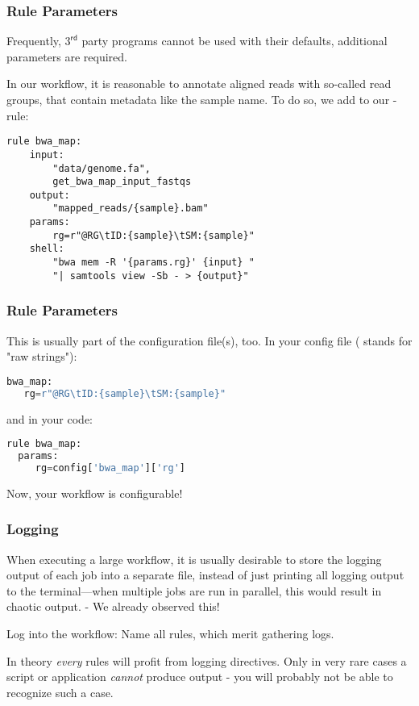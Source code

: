 \begin{frame}[fragile]
  \frametitle{Rule Parameters}
  \begin{warning}
  	Frequently, $3^\mathsf{rd}$ party programs cannot be used with their defaults, additional parameters are required.
  \end{warning}
  In our workflow, it is reasonable to annotate aligned reads with so-called read groups, that contain metadata like the sample name. \newline
  To do so, we add to our -rule:
  \begin{lstlisting}[style=Plain,basicstyle=\footnotesize]
rule bwa_map:
    input:
        "data/genome.fa",
        get_bwa_map_input_fastqs
    output:
        "mapped_reads/{sample}.bam"
    params:
        rg=r"@RG\tID:{sample}\tSM:{sample}"
    shell:
        "bwa mem -R '{params.rg}' {input} "
        "| samtools view -Sb - > {output}"
  \end{lstlisting}
\end{frame}

\begin{frame}[fragile]
  \frametitle{Rule Parameters}
  This is usually part of the configuration file(s), too.\newline
  In your config file ( stands for "raw strings"):
  \begin{lstlisting}[language=Python,style=Python]
bwa_map:
   rg=r"@RG\tID:{sample}\tSM:{sample}"
  \end{lstlisting}
  and in your code:
  \begin{lstlisting}[language=Python,style=Python]
rule bwa_map:
  params:
     rg=config['bwa_map']['rg']
  \end{lstlisting}
  Now, your workflow is configurable!
\end{frame}

\begin{frame}[fragile]
  \frametitle{Logging}
  \begin{hint}
  	When executing a large workflow, it is usually desirable to store the logging output of each job into a separate file, instead of just printing all logging output to the terminal—when multiple jobs are run in parallel, this would result in chaotic output. - We already observed this!
  \end{hint}
  \pause
  \begin{task}
  	Log into the workflow: Name all rules, which merit gathering logs.
  \end{task}
  \pause
  \begin{docs}
  	In theory \emph{every} rules will profit from logging directives. Only in very rare cases a script or application \emph{cannot} produce output - you will probably not be able to recognize such a case.
  \end{docs}
\end{frame}

